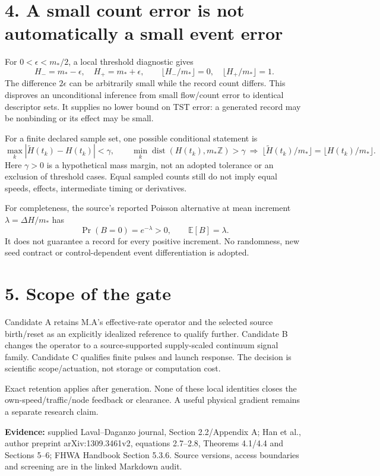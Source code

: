 \documentclass[11pt,a4paper]{article}
\begin{document}
\newpage
\section*{4. A small count error is not automatically a small event error}
For $0<\epsilon<m_*/2$, a local threshold diagnostic gives
\begin{equation}
H_-=m_*-\epsilon,\quad H_+=m_*+\epsilon,\qquad
\lfloor H_-/m_*\rfloor=0,\quad\lfloor H_+/m_*\rfloor=1.
\end{equation}
The difference $2\epsilon$ can be arbitrarily small while the record count
differs. This disproves an unconditional inference from small flow/count
error to identical descriptor sets. It supplies no lower bound on TST error:
a generated record may be nonbinding or its effect may be small.

For a finite declared sample set, one possible conditional statement is
\begin{equation}
\max_k|\widetilde H(t_k)-H(t_k)|<\gamma,\qquad
\min_k\operatorname{dist}(H(t_k),m_*\mathbb Z)>\gamma
\ \Longrightarrow\ 
\lfloor\widetilde H(t_k)/m_*\rfloor=\lfloor H(t_k)/m_*\rfloor.
\end{equation}
Here $\gamma>0$ is a hypothetical mass margin, not an adopted tolerance or
an exclusion of threshold cases. Equal sampled counts still do not imply
equal speeds, effects, intermediate timing or derivatives.

For completeness, the source's reported Poisson alternative at mean increment
$\lambda=\Delta H/m_*$ has
\begin{equation}
\Pr(B=0)=e^{-\lambda}>0,\qquad \mathbb E[B]=\lambda.
\end{equation}
It does not guarantee a record for every positive increment. No randomness,
new seed contract or control-dependent event differentiation is adopted.

\section*{5. Scope of the gate}
Candidate A retains M.A's effective-rate operator and the selected source
birth/reset as an explicitly idealized reference to qualify further. Candidate
B changes the operator to a source-supported supply-scaled continuum signal
family. Candidate C qualifies finite pulses and launch response. The decision
is scientific scope/actuation, not storage or computation cost.

Exact retention applies after generation. None of these local identities
closes the own-speed/traffic/node feedback or clearance. A useful physical
gradient remains a separate research claim.

\textbf{Evidence:} supplied Laval--Daganzo journal, Section 2.2/Appendix A;
Han et al., author preprint arXiv:1309.3461v2, equations 2.7--2.8, Theorems
4.1/4.4 and Sections 5--6; FHWA Handbook Section 5.3.6. Source versions,
access boundaries and screening are in the linked Markdown audit.
\end{document}
